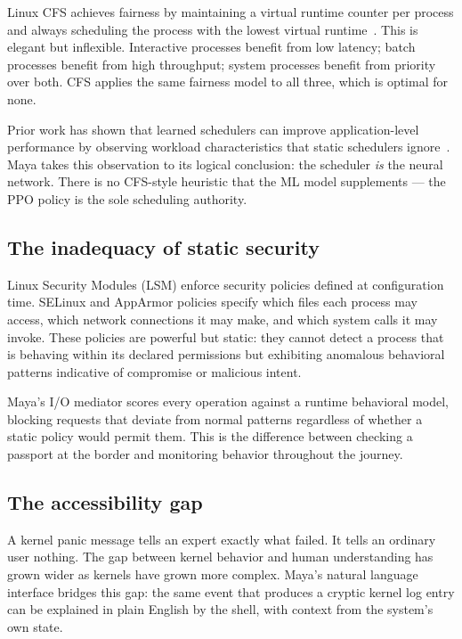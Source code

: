 \documentclass[letterpaper,twocolumn,10pt]{article}
\begin{document}
Linux CFS achieves fairness by maintaining a
virtual runtime counter per process and always
scheduling the process with the lowest virtual
runtime~\cite{linux-cfs}. This is elegant but
inflexible. Interactive processes benefit from
low latency; batch processes benefit from high
throughput; system processes benefit from
priority over both. CFS applies the same
fairness model to all three, which is optimal
for none.

Prior work has shown that learned schedulers
can improve application-level performance by
observing workload characteristics that static
schedulers ignore~\cite{paragon}. Maya takes
this observation to its logical conclusion:
the scheduler \textit{is} the neural network.
There is no CFS-style heuristic that the ML
model supplements --- the PPO policy is the
sole scheduling authority.

\subsection{The inadequacy of static security}

Linux Security Modules (LSM) enforce security
policies defined at configuration time. SELinux
and AppArmor policies specify which files each
process may access, which network connections
it may make, and which system calls it may
invoke. These policies are powerful but static:
they cannot detect a process that is behaving
within its declared permissions but exhibiting
anomalous behavioral patterns indicative of
compromise or malicious intent.

Maya's I/O mediator scores every operation
against a runtime behavioral model, blocking
requests that deviate from normal patterns
regardless of whether a static policy would
permit them. This is the difference between
checking a passport at the border and monitoring
behavior throughout the journey.

\subsection{The accessibility gap}

A kernel panic message tells an expert exactly
what failed. It tells an ordinary user nothing.
The gap between kernel behavior and human
understanding has grown wider as kernels have
grown more complex. Maya's natural language
interface bridges this gap: the same event
that produces a cryptic kernel log entry can
be explained in plain English by the shell,
with context from the system's own state.
\end{document}
